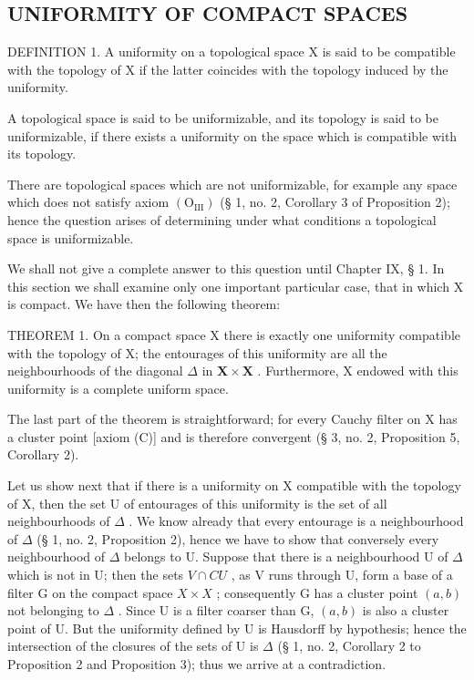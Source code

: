 \subsection{UNIFORMITY OF COMPACT SPACES}

DEFINITION 1. A uniformity on a topological space X is said to be compatible with the topology of X if the latter coincides with the topology induced by the uniformity.

A topological space is said to be uniformizable, and its topology is said to be uniformizable, if there exists a uniformity on the space which is compatible with its topology.

There are topological spaces which are not uniformizable, for example any space which does not satisfy axiom \((\mathrm{O}_{\mathrm{III}})\) (§ 1, no. 2, Corollary 3 of Proposition 2); hence the question arises of determining under what conditions a topological space is uniformizable.

We shall not give a complete answer to this question until Chapter IX, § 1. In this section we shall examine only one important particular case, that in which X is compact. We have then the following theorem:

THEOREM 1. On a compact space X there is exactly one uniformity compatible with the topology of X; the entourages of this uniformity are all the neighbourhoods of the diagonal \(\Delta\) in \(\mathbf{X} \times \mathbf{X}\) . Furthermore, X endowed with this uniformity is a complete uniform space.

The last part of the theorem is straightforward; for every Cauchy filter on X has a cluster point {[}axiom (C){]} and is therefore convergent (§ 3, no. 2, Proposition 5, Corollary 2).

Let us show next that if there is a uniformity on X compatible with the topology of X, then the set U of entourages of this uniformity is the set of all neighbourhoods of \(\Delta\) . We know already that every entourage is a neighbourhood of \(\Delta\) (§ 1, no. 2, Proposition 2), hence we have to show that conversely every neighbourhood of \(\Delta\) belongs to U. Suppose that there is a neighbourhood U of \(\Delta\) which is not in U; then the sets \(V \cap CU\) , as V runs through U, form a base of a filter G on the compact space \(X \times X\) ; consequently G has a cluster point \((a, b)\) not belonging to \(\Delta\) . Since U is a filter coarser than G, \((a, b)\) is also a cluster point of U. But the uniformity defined by U is Hausdorff by hypothesis; hence the intersection of the closures of the sets of U is \(\Delta\) (§ 1, no. 2, Corollary 2 to Proposition 2 and Proposition 3); thus we arrive at a contradiction.

